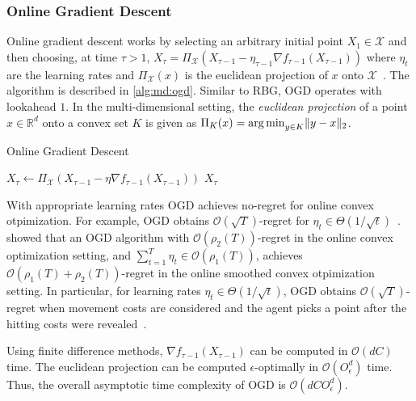 \subsubsection{Online Gradient Descent}

Online gradient descent works by selecting an arbitrary initial point $X_1 \in \mathcal{X}$ and then choosing, at time $\tau > 1$, $X_{\tau} = \Pi_{\mathcal{X}}(X_{\tau-1} - \eta_{\tau-1} \nabla f_{\tau-1}(X_{\tau-1}))$ where $\eta_t$ are the learning rates and $\Pi_{\mathcal{X}}(x)$ is the euclidean projection of $x$ onto $\mathcal{X}$~\cite{Andrew2015}. The algorithm is described in \cref{alg:md:ogd}. Similar to RBG, OGD operates with lookahead $1$. In the multi-dimensional setting, the \emph{euclidean projection} of a point $x \in \mathbb{R}^d$ onto a convex set $K$ is given as $\Pi_{K}(x) = \operatorname*{arg\,min}_{y \in K} \lVert y - x\rVert_2$.

\begin{algorithm}
    \caption{Online Gradient Descent~\cite{Andrew2015}}\label{alg:md:ogd}
    $X_{\tau} \gets \Pi_{\mathcal{X}}(X_{\tau-1} - \eta \nabla f_{\tau-1}(X_{\tau-1}))$\;
    \Return $X_{\tau}$\;
\end{algorithm}

With appropriate learning rates OGD achieves no-regret for online convex otpimization. For example, OGD obtains $\mathcal{O}(\sqrt{T})$-regret for $\eta_t \in \Theta(1 / \sqrt{t})$~\cite{Andrew2015}. \citeauthor*{Andrew2015}~\cite{Andrew2015} showed that an OGD algorithm with $\mathcal{O}(\rho_2(T))$-regret in the online convex optimization setting, and $\sum_{t=1}^T \eta_t \in \mathcal{O}(\rho_1(T))$, achieves $\mathcal{O}(\rho_1(T) + \rho_2(T))$-regret in the online smoothed convex otpimization setting. In particular, for learning rates $\eta_t \in \Theta(1 / \sqrt{t})$, OGD obtains $\mathcal{O}(\sqrt{T})$-regret when movement costs are considered and the agent picks a point after the hitting costs were revealed~\cite{Andrew2015}.

Using finite difference methods, $\nabla f_{\tau-1}(X_{\tau-1})$ can be computed in $\mathcal{O}(d C)$ time. The euclidean projection can be computed $\epsilon$-optimally in $\mathcal{O}(O_{\epsilon}^d)$ time. Thus, the overall asymptotic time complexity of OGD is $\mathcal{O}(d C O_{\epsilon}^d)$.

